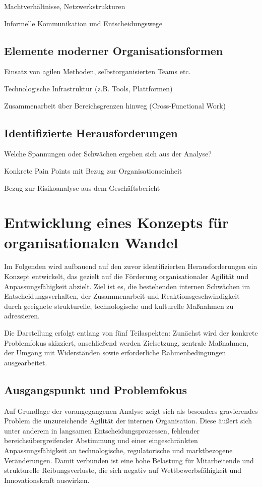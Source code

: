 \documentclass[12pt,a4paper]{article}
\begin{document}
	Machtverhältnisse, Netzwerkstrukturen
	
	Informelle Kommunikation und Entscheidungswege
	\subsection{Elemente moderner Organisationsformen}
	Einsatz von agilen Methoden, selbstorganisierten Teams etc.
	
	Technologische Infrastruktur (z.B. Tools, Plattformen)
	
	Zusammenarbeit über Bereichsgrenzen hinweg (Cross-Functional Work)
	\subsection{Identifizierte Herausforderungen}
	
	Welche Spannungen oder Schwächen ergeben sich aus der Analyse?
	
	Konkrete Pain Points mit Bezug zur Organisationseinheit
	
	Bezug zur Risikoanalyse aus dem Geschäftsbericht
	
	\section{Entwicklung eines Konzepts für organisationalen Wandel}
	Im Folgenden wird aufbauend auf den zuvor identifizierten Herausforderungen ein Konzept entwickelt, das gezielt auf die Förderung organisationaler Agilität und Anpassungsfähigkeit abzielt. Ziel ist es, die bestehenden internen Schwächen im Entscheidungsverhalten, der Zusammenarbeit und Reaktionsgeschwindigkeit durch geeignete strukturelle, technologische und kulturelle Maßnahmen zu adressieren.
	
	Die Darstellung erfolgt entlang von fünf Teilaspekten: Zunächst wird der konkrete Problemfokus skizziert, anschließend werden Zielsetzung, zentrale Maßnahmen, der Umgang mit Widerständen sowie erforderliche Rahmenbedingungen ausgearbeitet.
	\subsection{Ausgangspunkt und Problemfokus}
	Auf Grundlage der vorangegangenen Analyse zeigt sich als besonders gravierendes Problem die unzureichende Agilität der internen Organisation. Diese äußert sich unter anderem in langsamen Entscheidungsprozessen, fehlender bereichsübergreifender Abstimmung und einer eingeschränkten Anpassungsfähigkeit an technologische, regulatorische und marktbezogene Veränderungen. Damit verbunden ist eine hohe Belastung für Mitarbeitende und strukturelle Reibungsverluste, die sich negativ auf Wettbewerbsfähigkeit und Innovationskraft auswirken.
	
\end{document}
